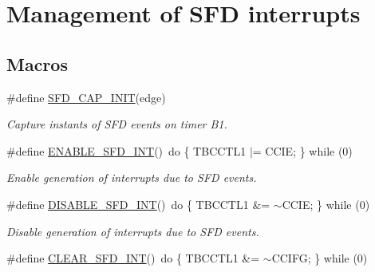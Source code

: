 \hypertarget{group__chaos__sfd}{\section{Management of S\-F\-D interrupts}
\label{group__chaos__sfd}
}
\subsection*{Macros}
\begin{DoxyCompactItemize}
\item 
\#define \hyperlink{group__chaos__sfd_ga770ed5e9afbb20260ce2791cd3159736}{S\-F\-D\-\_\-\-C\-A\-P\-\_\-\-I\-N\-I\-T}(edge)
\begin{DoxyCompactList}\small\item\em Capture instants of S\-F\-D events on timer B1. \end{DoxyCompactList}\item 
\hypertarget{group__chaos__sfd_ga6ba78a35b5699258b8686d954dcbfd68}{\#define \hyperlink{group__chaos__sfd_ga6ba78a35b5699258b8686d954dcbfd68}{E\-N\-A\-B\-L\-E\-\_\-\-S\-F\-D\-\_\-\-I\-N\-T}()~do \{ T\-B\-C\-C\-T\-L1 $|$= C\-C\-I\-E; \} while (0)}\label{group__chaos__sfd_ga6ba78a35b5699258b8686d954dcbfd68}

\begin{DoxyCompactList}\small\item\em Enable generation of interrupts due to S\-F\-D events. \end{DoxyCompactList}\item 
\hypertarget{group__chaos__sfd_ga5d2af32ec554abaa0bcaa31d91632af1}{\#define \hyperlink{group__chaos__sfd_ga5d2af32ec554abaa0bcaa31d91632af1}{D\-I\-S\-A\-B\-L\-E\-\_\-\-S\-F\-D\-\_\-\-I\-N\-T}()~do \{ T\-B\-C\-C\-T\-L1 \&= $\sim$C\-C\-I\-E; \} while (0)}\label{group__chaos__sfd_ga5d2af32ec554abaa0bcaa31d91632af1}

\begin{DoxyCompactList}\small\item\em Disable generation of interrupts due to S\-F\-D events. \end{DoxyCompactList}\item 
\hypertarget{group__chaos__sfd_ga86745c888328a99fd33f1c9a25b88543}{\#define \hyperlink{group__chaos__sfd_ga86745c888328a99fd33f1c9a25b88543}{C\-L\-E\-A\-R\-\_\-\-S\-F\-D\-\_\-\-I\-N\-T}()~do \{ T\-B\-C\-C\-T\-L1 \&= $\sim$C\-C\-I\-F\-G; \} while (0)}\label{group__chaos__sfd_ga86745c888328a99fd33f1c9a25b88543}


\end{DoxyCompactItemize}
